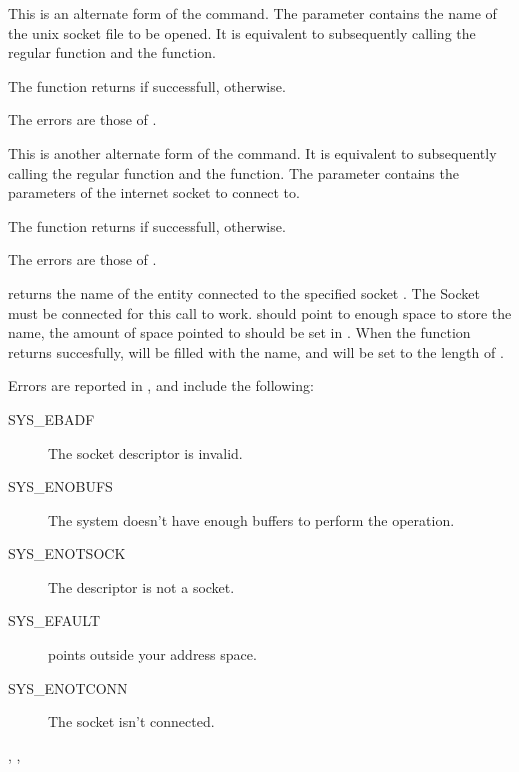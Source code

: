 { This is an alternate form of the  command. The parameter
 contains the name of the unix socket file to be opened. 
It is equivalent to subsequently calling the regular  
function and the   function.

The function returns  if successfull,  otherwise.
}{The errors are those of .}
{}


{ This is another alternate form of the  command. 
It is equivalent
to subsequently calling the regular  function and the 
 function. The  parameter contains the parameters
of the internet socket to connect to.

The function returns  if successfull,  otherwise.
}{The errors are those of .}
{}



{ returns the name of the entity connected to the 
specified socket . The Socket must be connected for this call to
work. 
 should point to enough space to store the name, the
amount of space pointed to should be set in . 
When the function returns succesfully,  will be filled with the 
name, and  will be set to the length of .
}
{Errors are reported in , and include the following:
\begin{description}
\item[SYS\_EBADF] The socket descriptor is invalid.
\item[SYS\_ENOBUFS] The system doesn't have enough buffers to perform the
operation.
\item[SYS\_ENOTSOCK] The descriptor is not a socket.
\item[SYS\_EFAULT]  points outside your address space.
\item[SYS\_ENOTCONN] The socket isn't connected.
\end{description}
}{, , }

